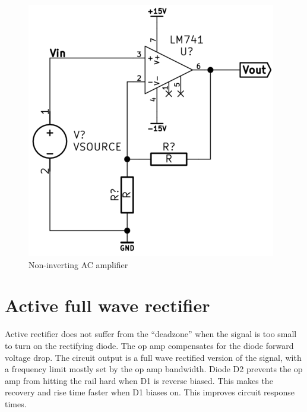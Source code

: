 \documentclass[]{article}
\begin{document}
\begin{figure}[htbp]
\centering
\includegraphics[scale=0.5]{img/noninvACamp.png}
\caption{Non-inverting AC amplifier}
\end{figure}

\section{Active full wave rectifier}\label{active-full-wave-rectifier}

Active rectifier does not suffer from the ``deadzone'' when the signal
is too small to turn on the rectifying diode. The op amp compensates for
the diode forward voltage drop. The circuit output is a full wave
rectified version of the signal, with a frequency limit mostly set by
the op amp bandwidth. Diode D2 prevents the op amp from hitting the rail
hard when D1 is reverse biased. This makes the recovery and rise time
faster when D1 biases on. This improves circuit response times.
\end{document}
